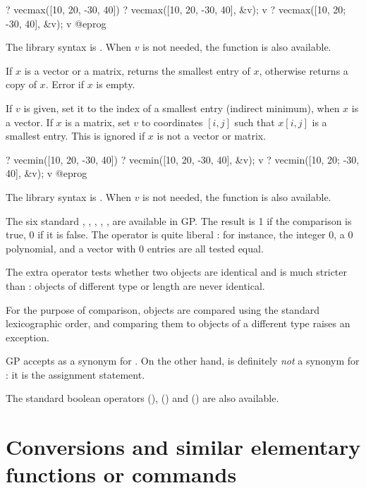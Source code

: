 \bprog
? vecmax([10, 20, -30, 40])
? vecmax([10, 20, -30, 40], &v); v
? vecmax([10, 20; -30, 40], &v); v
@eprog

The library syntax is .
When $v$ is not needed, the function  is
also available.

\label{se:vecmin}
If $x$ is a vector or a matrix, returns the smallest entry of $x$,
otherwise returns a copy of $x$. Error if $x$ is empty.

If $v$ is given, set it to the index of a smallest entry (indirect minimum),
when $x$ is a vector. If $x$ is a matrix, set $v$ to coordinates $[i,j]$ such
that $x[i,j]$ is a smallest entry. This is ignored if $x$ is not a vector or
matrix.

\bprog
? vecmin([10, 20, -30, 40])
? vecmin([10, 20, -30, 40], &v); v
? vecmin([10, 20; -30, 40], &v); v
@eprog

The library syntax is .
When $v$ is not needed, the function  is also
available.

 The six
standard  \kbd{<=}, \kbd{<}, \kbd{>=}, \kbd{>},
\kbd{==}, \kbd{!=} are available in GP. The result is 1 if the comparison is
true, 0 if it is false. The operator \kbd{==} is quite liberal : for
instance, the integer 0, a 0 polynomial, and a vector with 0 entries are all
tested equal.

The extra operator \kbd{===} tests whether two objects are identical and is
much stricter than \kbd{==} : objects of different type or length are never
identical.

For the purpose of comparison,  objects are compared using
the standard lexicographic order, and comparing them to objects
of a different type raises an exception.

GP accepts \kbd{<>} as a synonym for \kbd{!=}. On the other hand, \kbd{=} is
definitely \emph{not} a synonym for \kbd{==}: it is the assignment statement.

The standard boolean operators \kbd{||} (), \kbd{\&\&}
() and \kbd{!} () are also available.

\section{Conversions and similar elementary functions or commands}
\label{se:conversion}

